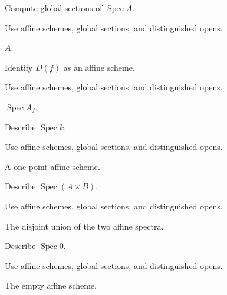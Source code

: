 \begin{exercise}\label{exr:vi18-expand-01}
Compute global sections of $\operatorname{Spec}A$.
\end{exercise}
\begin{hint}
Use affine schemes, global sections, and distinguished opens.
\end{hint}
\begin{solution}
$A$.
\end{solution}

\begin{exercise}\label{exr:vi18-expand-02}
Identify $D(f)$ as an affine scheme.
\end{exercise}
\begin{hint}
Use affine schemes, global sections, and distinguished opens.
\end{hint}
\begin{solution}
$\operatorname{Spec}A_f$.
\end{solution}

\begin{exercise}[Field]\label{exr:vi18-expand-03}
Describe $\operatorname{Spec}k$.
\end{exercise}
\begin{hint}
Use affine schemes, global sections, and distinguished opens.
\end{hint}
\begin{solution}
A one-point affine scheme.
\end{solution}

\begin{exercise}[Product]\label{exr:vi18-expand-04}
Describe $\operatorname{Spec}(A\times B)$.
\end{exercise}
\begin{hint}
Use affine schemes, global sections, and distinguished opens.
\end{hint}
\begin{solution}
The disjoint union of the two affine spectra.
\end{solution}

\begin{exercise}\label{exr:vi18-expand-05}
Describe $\operatorname{Spec}0$.
\end{exercise}
\begin{hint}
Use affine schemes, global sections, and distinguished opens.
\end{hint}
\begin{solution}
The empty affine scheme.
\end{solution}

